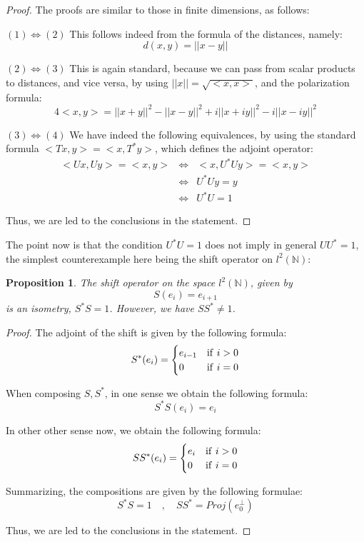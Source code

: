 \documentclass[12pt]{amsbook}
\newtheorem{proposition}[theorem]{Proposition}
\begin{document}
\begin{proof}
The proofs are similar to those in finite dimensions, as follows:

\medskip

$(1)\iff(2)$ This follows indeed from the formula of the distances, namely:
$$d(x,y)=||x-y||$$

$(2)\iff(3)$ This is again standard, because we can pass from scalar products to distances, and vice versa, by using $||x||=\sqrt{<x,x>}$, and the polarization formula:
$$4<x,y>=||x+y||^2-||x-y||^2+i||x+iy||^2-i||x-iy||^2$$

$(3)\iff(4)$ We have indeed the following equivalences, by using the standard formula $<Tx,y>=<x,T^*y>$, which defines the adjoint operator:
\begin{eqnarray*}
<Ux,Uy>=<x,y>
&\iff&<x,U^*Uy>=<x,y>\\
&\iff&U^*Uy=y\\
&\iff&U^*U=1
\end{eqnarray*}

Thus, we are led to the conclusions in the statement.
\end{proof}

The point now is that the condition $U^*U=1$ does not imply in general $UU^*=1$, the simplest counterexample here being the shift operator on $l^2(\mathbb N)$:


\begin{proposition}
The shift operator on the space $l^2(\mathbb N)$, given by
$$S(e_i)=e_{i+1}$$
is an isometry, $S^*S=1$. However, we have $SS^*\neq1$.
\end{proposition}

\begin{proof}
The adjoint of the shift is given by the following formula:
$$S^*(e_i)=\begin{cases}
e_{i-1}&{\rm if}\ i>0\\
0&{\rm if}\ i=0
\end{cases}$$

When composing $S,S^*$, in one sense we obtain the following formula:
$$S^*S(e_i)=e_i$$

In other other sense now, we obtain the following formula:
$$SS^*(e_i)=\begin{cases}
e_i&{\rm if}\ i>0\\
0&{\rm if}\ i=0
\end{cases}$$

Summarizing, the compositions are given by the following formulae:
$$S^*S=1\quad,\quad 
SS^*=Proj(e_0^\perp)$$

Thus, we are led to the conclusions in the statement.
\end{proof}
\end{document}
